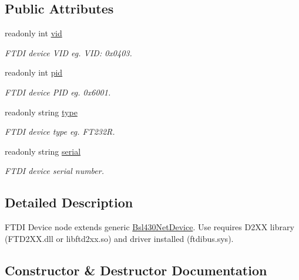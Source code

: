 \subsection*{Public Attributes}
\begin{DoxyCompactItemize}
\item 
readonly int \mbox{\hyperlink{class_b_s_l430___n_e_t_1_1_comm_1_1_f_t_d_i___device_a898c89b3775fbf5dd54da1fdf03330c0}{vid}}
\begin{DoxyCompactList}\small\item\em F\+T\+DI device V\+ID eg. V\+ID\+: 0x0403. \end{DoxyCompactList}\item 
readonly int \mbox{\hyperlink{class_b_s_l430___n_e_t_1_1_comm_1_1_f_t_d_i___device_a1c024783d6837f9a2a4e2d01690fdab5}{pid}}
\begin{DoxyCompactList}\small\item\em F\+T\+DI device P\+ID eg. 0x6001. \end{DoxyCompactList}\item 
readonly string \mbox{\hyperlink{class_b_s_l430___n_e_t_1_1_comm_1_1_f_t_d_i___device_a08ecf8436a9e6e20ce5041d7899f822c}{type}}
\begin{DoxyCompactList}\small\item\em F\+T\+DI device type eg. F\+T232R. \end{DoxyCompactList}\item 
readonly string \mbox{\hyperlink{class_b_s_l430___n_e_t_1_1_comm_1_1_f_t_d_i___device_a44f740e3b911a3e6b0b2f2f73b2da1b9}{serial}}
\begin{DoxyCompactList}\small\item\em F\+T\+DI device serial number. \end{DoxyCompactList}\end{DoxyCompactItemize}


\subsection{Detailed Description}
F\+T\+DI Device node extends generic \mbox{\hyperlink{class_b_s_l430___n_e_t_1_1_bsl430_net_device}{Bsl430\+Net\+Device}}. Use requires D2\+XX library (F\+T\+D2\+X\+X.\+dll or libftd2xx.\+so) and driver installed (ftdibus.\+sys). 



\subsection{Constructor \& Destructor Documentation}
\mbox{\label{class_b_s_l430___n_e_t_1_1_comm_1_1_f_t_d_i___device_a747dd9c01a41ba754c6a9839a7389f90}} 
